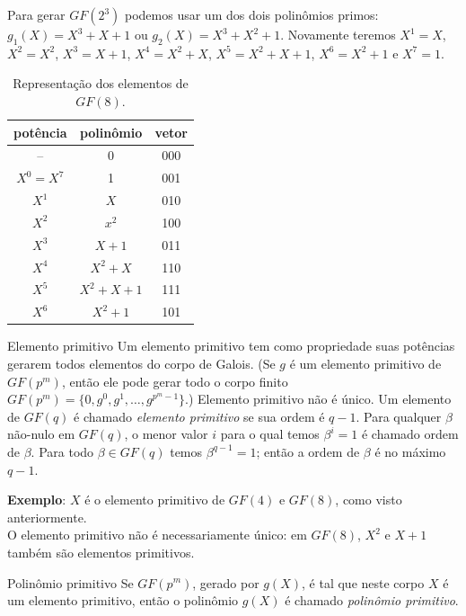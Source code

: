 \begin{frame}[allowframebreaks]
  \framebreak
  Para gerar $GF(2^3)$ podemos usar um dos dois polinômios primos: $g_1(X) = X^3 + X + 1$ ou $g_2(X) = X^3 + X^2 + 1$.
  Novamente teremos $X^1 = X$, $X^2 = X^2$, $X^3 = X+1$, $X^4 = X^2 + X$, $X^5 = X^2 + X + 1$, $X^6 = X^2 + 1$ e $X^7 = 1$.
  \begin{table}
    \caption{Representação dos elementos de $GF(8).$}\label{tab-gf8}
    \begin{tabular}{ccc}
      potência & polinômio & vetor \\
      \hline
      --        & 0         & 000 \\
      $X^0=X^7$ & 1         & 001 \\
      $X^1$     & $X$       & 010 \\
      $X^2$     & $x^2$     & 100 \\
      $X^3$     & $X+1$     & 011 \\
      $X^4$     & $X^2+X$   & 110 \\
      $X^5$     & $X^2+X+1$ & 111 \\
      $X^6$     & $X^2+1$   & 101 \\
      \hline 
    \end{tabular}
  \end{table}


  \framebreak

  \begin{block}{Elemento primitivo}
    Um elemento primitivo tem como propriedade suas potências gerarem todos elementos do corpo de Galois.
    (Se $g$ é um elemento primitivo de $GF(p^m)$, então ele pode gerar todo o corpo finito $GF(p^m) = \{0, g^0, g^1, \ldots, g^{p^m-1}\}$.)
    Elemento primitivo não é único. Um elemento de $GF(q)$ é chamado \emph{elemento primitivo} se sua ordem é $q-1$.
    Para qualquer $\beta$ não-nulo em $GF(q)$, o menor valor $i$ para o qual temos $\beta^i = 1$ é chamado ordem de $\beta$.
    Para todo $\beta \in GF(q)$ temos $\beta^{q-1} = 1$; então a ordem de $\beta$ é no máximo $q-1$.
  \end{block}

  \textbf{Exemplo}: $X$ é o elemento primitivo de $GF(4)$ e $GF(8)$, como visto anteriormente.\\
  O elemento primitivo não é necessariamente único: em $GF(8)$, $X^2$ e $X+1$ também são elementos primitivos.

  \framebreak
  \begin{block}{Polinômio primitivo}
    Se $GF(p^m)$, gerado por $g(X)$, é tal que neste corpo $X$ é um elemento primitivo,
    então o polinômio $g(X)$ é chamado \emph{polinômio primitivo}.


\end{block}
\end{frame}
